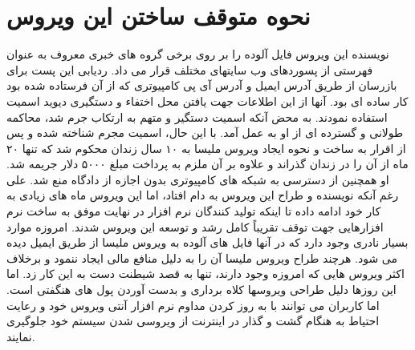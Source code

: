 \section{نحوه متوقف ساختن این ویروس}
نویسنده این ویروس فایل آلوده را بر روی برخی گروه های خبری معروف به عنوان فهرستی از پسوردهای
وب سایتهای مختلف قرار می داد. ردیابی این پست برای بازرسان از طریق آدرس ایمیل و آدرس آی پی
کامپیوتری که از آن فرستاده شده بود کار ساده ای بود. آنها از این اطلاعات جهت یافتن محل اختفاء
و دستگیری دیوید اسمیت استفاده نمودند. به محض آنکه اسمیت دستگیر و متهم به ارتکاب جرم شد،
محاکمه طولانی و گسترده ای از او به عمل آمد. با این حال، اسمیت مجرم شناخته شده و پس از اقرار
به ساخت و نحوه ایجاد ویروس ملیسا به ۱۰ سال زندان محکوم شد که تنها ۲۰ ماه از آن را در زندان
گذراند و علاوه بر آن ملزم به پرداخت مبلغ ۵۰۰۰ دلار جریمه شد. او همچنین از دسترسی به شبکه های
کامپیوتری بدون اجازه از دادگاه منع شد. علی رغم آنکه نویسنده و طراح این ویروس به دام افتاد، اما این
ویروس ماه های زیادی به کار خود ادامه داده تا اینکه تولید کنندگان نرم افزار در نهایت موفق به ساخت
نرم افزارهایی جهت توقف تقریباً کامل رشد و توسعه این ویروس شدند. امروزه موارد بسیار نادری وجود
دارد که در آنها فایل های آلوده به ویروس ملیسا از طریق ایمیل دیده می شود. هرچند طراح ویروس ملیسا
آن را به دلیل منافع مالی ایجاد ننمود و برخلاف اکثر ویروس هایی که امروزه وجود دارند، تنها به قصد
شیطنت دست به این کار زد. اما این روزها دلیل طراحی ویروسها کلاه برداری و بدست آوردن پول های هنگفتی است. اما کاربران می توانند با به روز کردن مداوم نرم افزار آنتی ویروس خود و رعایت احتیاط
به هنگام گشت و گذار در اینترنت از ویروسی شدن سیستم خود جلوگیری نمایند.


